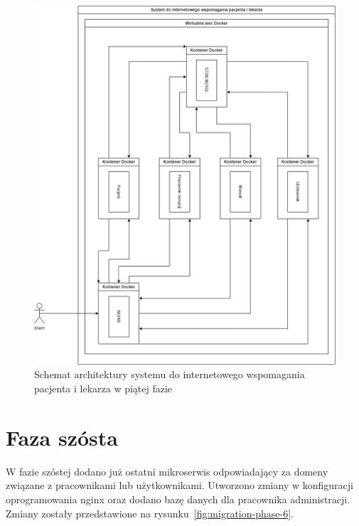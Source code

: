\documentclass[12pt,twoside]{book}
\newcommand{\captionvspace}{\vspace{6pt}}
\begin{document}
    \begin{figure}[ht]
        \centering
        \includegraphics[width=\textwidth]{includes/images/migration-phase-5.png}
        \captionvspace
        \caption{Schemat architektury systemu do internetowego wspomagania pacjenta i lekarza w piątej fazie}
        \label{fig:migration-phase-5}
    \end{figure}


    \section{Faza szósta}
    W fazie szóstej dodano już ostatni mikroserwis odpowiadający za domeny związane z pracownikami lub użytkownikami. Utworzono zmiany w konfiguracji oprogramowania nginx oraz dodano bazę danych dla pracownika administracji. Zmiany zostały przedstawione na rysunku~\ref{fig:migration-phase-6}.
\end{document}
